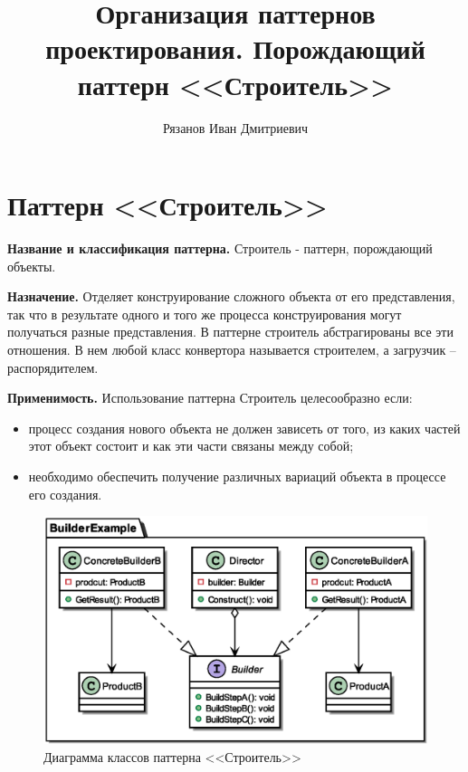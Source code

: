 \documentclass[PI,LAB]{HSEUniversity}
\title{Организация паттернов проектирования. Порождающий паттерн <<Строитель>>}
\author{Рязанов Иван Дмитриевич}
\begin{document}
\maketitle
\chapter{Паттерн <<Строитель>>}
\textbf{Название и классификация паттерна.}
Строитель - паттерн, порождающий объекты.

\textbf{Назначение.}
Отделяет конструирование сложного объекта от его представления, так что в результате одного и того же процесса конструирования могут получаться разные представления.
В паттерне строитель абстрагированы все эти отношения. В нем любой класс конвертора называется строителем, а загрузчик – распорядителем.

\textbf{Применимость.}
Использование паттерна Строитель целесообразно если:
\begin{itemize}
  \item процесс создания нового объекта не должен зависеть от того, из каких частей этот объект состоит и как эти части связаны между собой;
  \item необходимо обеспечить получение различных вариаций объекта в процессе его создания.
\end{itemize}
\clearpage

\begin{figure}[p]
  \centering
  \includegraphics[scale=0.7]{Builder_CD.eps}
  \caption{Диаграмма классов паттерна <<Строитель>>}
\end{figure}
\end{document}
